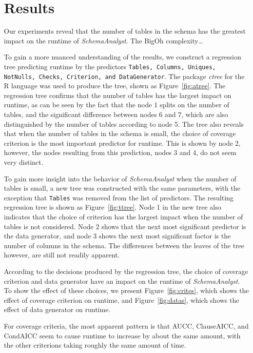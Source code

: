 \section{Results}
  \label{sec:results}

Our experiments reveal that the number of tables in the schema has the
greatest impact on the runtime of \textit{SchemaAnalyst}. The BigOh
complexity\dots 

To gain a more nuanced understanding of the results, we construct a
regression tree predicting runtime by the predictors \texttt{Tables,
Columns, Uniques, NotNulls, Checks, Criterion, and DataGenerator}. The
package \textit{ctree} for the R language was used to produce the tree,
shown as Figure~\ref{fig:atree}. The regression tree confirms that the
number of tables has the largest impact on runtime, as can be seen by
the fact that the node 1 splits on the number of tables, and the
significant difference between nodes 6 and 7, which are also
distinguished by the number of tables according to node 5. The tree also
reveals that when the number of tables in the schema is small, the
choice of coverage criterion is the most important predictor for
runtime.  This is shown by node 2, however, the nodes resulting from this
prediction, nodes 3 and 4, do not seem very distinct.  

To gain more insight into the behavior of \textit{SchemaAnalyst} when
the number of tables is small, a new tree was constructed with the same
parameters, with the exception that \texttt{Tables} was removed from
the list of predictors. The resulting regression tree is shown as
Figure~\ref{fig:ttree}.  Node 1 in the new tree also indicates that
the choice of criterion has the largest impact when the number of tables
is not considered.  Node 2 shows that the next most significant
predictor is the data generator, and node 3 shows the next most
significant factor is the number of columns in the schema.  The
differences between the leaves of the tree however, are still not
readily apparent. 

According to the decisions produced by the regression tree, the choice
of coverage criterion and data generator have an impact on the runtime
of \textit{SchemaAnalyst}. To show the effect of these choices, we
present Figure~\ref{fig:crites}, which shows the effect of coverage
criterion on runtime, and Figure~\ref{fig:datas}, which shows the effect
of data generator on runtime.  

For coverage criteria, the most apparent pattern is that AUCC,
ClauseAICC, and CondAICC seem to cause runtime to increase by about the
same amount, with the other criterions taking roughly the same amount of
time.

